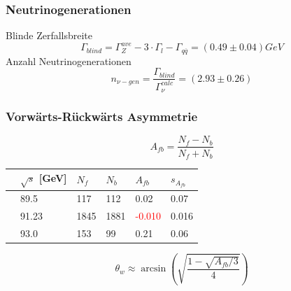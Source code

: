 \begin{frame}
	\frametitle{Neutrinogenerationen}
	\hspace{2cm} Blinde Zerfallsbreite
	\begin{equation*}
		\Gamma_{blind}=\Gamma_{Z}^{ave}-3\cdot\Gamma_l-\Gamma_{q\overline{q}}=(0.49\pm0.04)\unit{GeV}
	\end{equation*}
	\hspace{2cm} Anzahl Neutrinogenerationen
	\begin{equation*}
		n_{\nu-gen}=\frac{\Gamma_{blind}}{\Gamma_{\nu}^{calc}}=(2.93\pm0.26)
	\end{equation*}
\end{frame}
\begin{frame}
	\frametitle{Vorwärts-Rückwärts Asymmetrie}
	\begin{equation*}
		A_{fb}=\frac{N_f-N_b}{N_f+N_b}
	\end{equation*}
	\begin{table}[h]\centering
		\begin{tabular}{@{}llllll@{}}
			\toprule
			&$\sqrt{s}$ [GeV]&$N_f$&$N_b$&$A_{fb}$&$s_{A_{fb}}$\\
			\midrule
			&89.5&117&112&0.02&0.07\\
			&91.23&1845&1881&\textcolor{red}{-0.010}&0.016\\
			&93.0&153&99&0.21&0.06\\
			\bottomrule
		\end{tabular}
	\end{table}
	\begin{equation*}
	\theta_w\approx\arcsin(\sqrt{\frac{1-\sqrt{A_{fb}/3}}{4}})
	\end{equation*}
\end{frame}




